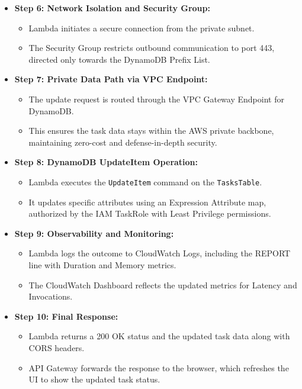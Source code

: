 \begin{itemize}
\begin{itemize}
  \end{itemize}
  \item \textbf{Step 6: Network Isolation and Security Group:}
  \begin{itemize}
    \item Lambda initiates a secure connection from the private subnet.
    \item The Security Group restricts outbound communication to port 443, directed only towards the DynamoDB Prefix List.
  \end{itemize}
  \item \textbf{Step 7: Private Data Path via VPC Endpoint:}
  \begin{itemize}
    \item The update request is routed through the VPC Gateway Endpoint for DynamoDB.
    \item This ensures the task data stays within the AWS private backbone, maintaining zero-cost and defense-in-depth security.
  \end{itemize}
  \item \textbf{Step 8: DynamoDB UpdateItem Operation:}
  \begin{itemize}
    \item Lambda executes the \texttt{UpdateItem} command on the \texttt{TasksTable}.
    \item It updates specific attributes using an Expression Attribute map, authorized by the IAM TaskRole with Least Privilege permissions.
  \end{itemize}
  \item \textbf{Step 9: Observability and Monitoring:}
  \begin{itemize}
    \item Lambda logs the outcome to CloudWatch Logs, including the REPORT line with Duration and Memory metrics.
    \item The CloudWatch Dashboard reflects the updated metrics for Latency and Invocations.
  \end{itemize}
  \item \textbf{Step 10: Final Response:}
  \begin{itemize}
    \item Lambda returns a 200 OK status and the updated task data along with CORS headers.
    \item API Gateway forwards the response to the browser, which refreshes the UI to show the updated task status.
  \end{itemize}
\end{itemize}

